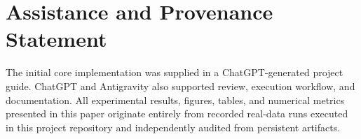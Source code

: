 \documentclass[conference]{IEEEtran}
\begin{document}
\section*{Assistance and Provenance Statement}
The initial core implementation was supplied in a ChatGPT-generated project guide. ChatGPT and Antigravity also supported review, execution workflow, and documentation. All experimental results, figures, tables, and numerical metrics presented in this paper originate entirely from recorded real-data runs executed in this project repository and independently audited from persistent artifacts.

{\footnotesize


}
\end{document}
